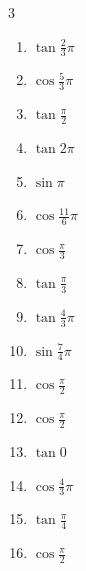 \begin{multicols}{3}
\begin{enumerate}
  \item $\displaystyle \tan{\frac{2}{3}\pi}$

  \item $\displaystyle \cos{\frac{5}{3}\pi}$

  \item $\displaystyle \tan{\frac{\pi}{2}}$
        \phantom{$\displaystyle \quad なし$}

  \item $\displaystyle \tan{2\pi}$
        \phantom{$\displaystyle =0$}

  \item $\displaystyle \sin{\pi}$
        \phantom{$\displaystyle =0$}

  \item $\displaystyle \cos{\frac{11}{6}\pi}$

  \item $\displaystyle \cos{\frac{\pi}{3}}$

  \item $\displaystyle \tan{\frac{\pi}{3}}$

  \item $\displaystyle \tan{\frac{4}{3}\pi}$

  \item $\displaystyle \sin{\frac{7}{4}\pi}$

  \item $\displaystyle \cos{\frac{\pi}{2}}$
        \phantom{$\displaystyle =0$}

  \item $\displaystyle \cos{\frac{\pi}{2}}$
        \phantom{$\displaystyle =0$}

  \item $\displaystyle \tan{0}$
        \phantom{$\displaystyle =0$}

  \item $\displaystyle \cos{\frac{4}{3}\pi}$

  \item $\displaystyle \tan{\frac{\pi}{4}}$
        \phantom{$\displaystyle =1$}

  \item $\displaystyle \cos{\frac{\pi}{2}}$
        \phantom{$\displaystyle =0$}


\end{enumerate}
\end{multicols}
